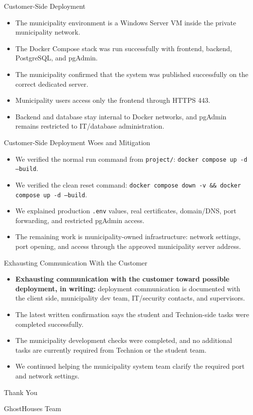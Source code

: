 \documentclass[aspectratio=169]{beamer}
\begin{document}
\begin{frame}{Customer-Side Deployment}
  \begin{itemize}
    \item The municipality environment is a Windows Server VM inside the private municipality network.
    \item The Docker Compose stack was run successfully with frontend, backend, PostgreSQL, and pgAdmin.
    \item The municipality confirmed that the system was published successfully on the correct dedicated server.
    \item Municipality users access only the frontend through HTTPS 443.
    \item Backend and database stay internal to Docker networks, and pgAdmin remains restricted to IT/database administration.
  \end{itemize}
\end{frame}

\begin{frame}{Customer-Side Deployment Woes and Mitigation}
  \begin{itemize}
    \item We verified the normal run command from \texttt{project/}: \texttt{docker compose up -d --build}.
    \item We verified the clean reset command: \texttt{docker compose down -v \&\& docker compose up -d --build}.
    \item We explained production \texttt{.env} values, real certificates, domain/DNS, port forwarding, and restricted pgAdmin access.
    \item The remaining work is municipality-owned infrastructure: network settings, port opening, and access through the approved municipality server address.
  \end{itemize}
\end{frame}

\begin{frame}{Exhausting Communication With the Customer}
  \begin{itemize}
    \item \textbf{Exhausting communication with the customer toward possible deployment, in writing:} deployment communication is documented with the client side, municipality dev team, IT/security contacts, and supervisors.
    \item The latest written confirmation says the student and Technion-side tasks were completed successfully.
    \item The municipality development checks were completed, and no additional tasks are currently required from Technion or the student team.
    \item We continued helping the municipality system team clarify the required port and network settings.
  \end{itemize}
\end{frame}

\begin{frame}
  \centering
  \vfill
  {\Huge Thank You}
  \vspace{0.5cm}

  {\large GhostHouses Team}
  \vfill
\end{frame}
\end{document}
